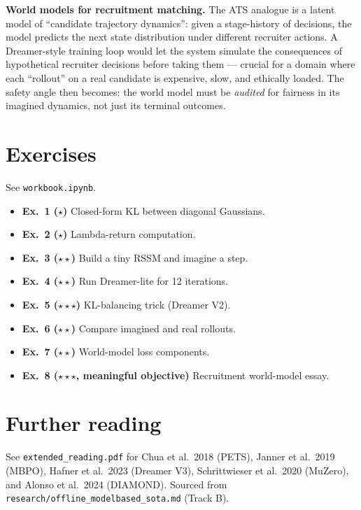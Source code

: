 \documentclass[11pt,oneside]{scrbook}
\begin{document}
\begin{matching}
\textbf{World models for recruitment matching.} The ATS analogue is a latent model of
``candidate trajectory dynamics'': given a stage-history of decisions, the model
predicts the next state distribution under different recruiter actions. A Dreamer-style
training loop would let the system simulate the consequences of hypothetical recruiter
decisions before taking them --- crucial for a domain where each ``rollout'' on a real
candidate is expensive, slow, and ethically loaded. The safety angle then becomes:
the world model must be \emph{audited} for fairness in its imagined dynamics, not just
its terminal outcomes.
\end{matching}

\chapter{Exercises}

See \texttt{workbook.ipynb}.
\begin{itemize}
  \item \textbf{Ex.\ 1 ($\star$)} Closed-form KL between diagonal Gaussians.
  \item \textbf{Ex.\ 2 ($\star$)} Lambda-return computation.
  \item \textbf{Ex.\ 3 ($\star\star$)} Build a tiny RSSM and imagine a step.
  \item \textbf{Ex.\ 4 ($\star\star$)} Run Dreamer-lite for 12 iterations.
  \item \textbf{Ex.\ 5 ($\star\star\star$)} KL-balancing trick (Dreamer V2).
  \item \textbf{Ex.\ 6 ($\star\star$)} Compare imagined and real rollouts.
  \item \textbf{Ex.\ 7 ($\star\star$)} World-model loss components.
  \item \textbf{Ex.\ 8 ($\star\star\star$, meaningful objective)} Recruitment world-model essay.
\end{itemize}

\chapter{Further reading}

See \texttt{extended\_reading.pdf} for Chua et al.\ 2018 (PETS), Janner et al.\ 2019
(MBPO), Hafner et al.\ 2023 (Dreamer V3), Schrittwieser et al.\ 2020 (MuZero), and
Alonso et al.\ 2024 (DIAMOND). Sourced from \texttt{research/offline\_modelbased\_sota.md}
(Track B).
\end{document}
